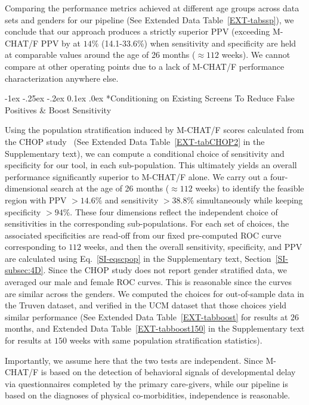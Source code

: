 \documentclass[onecolumn,,10pt]{IEEEtran}
\makeatletter
\renewcommand\subsection{\@startsection {section}{1}{\z@}%
  {-1ex \@plus -.25ex \@minus -.2ex}%
  {0.1ex \@plus.0ex}%
  {\fontsize{11}{12}\selectfont\bfseries\sffamily\color{DodgerBlue4}}}
\makeatother
\begin{document}
Comparing the performance metrics achieved at different age groups across data sets and genders for our pipeline (See Extended Data Table~\ref{EXT-tabssp}), we conclude that our approach produces a strictly superior PPV (exceeding M-CHAT/F PPV by at  $14\%$ (14.1-33.6\%) when sensitivity and specificity are held at comparable values around the age of 26 months ($\approx 112$ weeks). We cannot compare at other operating points due to a lack of M-CHAT/F performance characterization anywhere else.

\subsection*{Conditioning on  Existing Screens To Reduce False Positives \& Boost Sensitivity}

Using the population stratification induced by M-CHAT/F scores  calculated from the CHOP study~\cite{pmid31562252} (See Extended Data Table~\ref{EXT-tabCHOP2} in the Supplementary text), we can compute a conditional choice of sensitivity and specificity for our tool, in each sub-population. This ultimately yields an overall performance significantly  superior to  M-CHAT/F alone.
We carry out a four-dimensional search at the age of 26 months ($\approx 112$ weeks) 
to  identify the feasible region with  PPV  $>14.6\%$ and sensitivity  $>38.8\%$ simultaneously while keeping specificity  $>94\%$. These four  dimensions reflect the independent choice of sensitivities in the corresponding sub-populations. For each set of  choices, the associated  specificities are read-off from our fixed pre-computed ROC curve corresponding to $112$ weeks, and then the overall sensitivity, specificity, and PPV are calculated using Eq.~\eqref{SI-eqscpop} in the Supplementary text, Section~\ref{SI-subsec:4D}. Since the CHOP study does not report gender stratified data, we averaged our male and female ROC curves. This is reasonable since the curves are  similar across  the genders. We computed the choices for out-of-sample data in the Truven dataset, and verified in the UCM dataset that those choices yield similar performance (See Extended Data Table~\ref{EXT-tabboost} for results at $26$ months, and Extended Data  Table~\ref{EXT-tabboost150} in the Supplementary text for results at $150$ weeks with same population stratification statistics).

Importantly, we assume here that the two tests are independent.
Since M-CHAT/F is based on the detection of behavioral signals of developmental delay  via questionnaires completed by the primary care-givers, while our pipeline is based on the diagnoses of  physical co-morbidities, independence is reasonable. 
 
\end{document}
